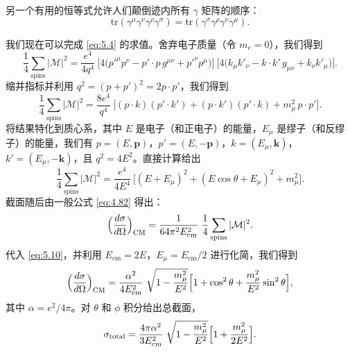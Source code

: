 另一个有用的恒等式允许人们颠倒迹内所有 $\gamma$ 矩阵的顺序：
\begin{equation}
  \mathrm{tr}(\gamma^\mu\gamma^\nu\gamma^\rho\gamma^\sigma)
    = \mathrm{tr}(\gamma^\sigma\gamma^\rho\gamma^\nu\gamma^\mu) .
  \label{eq:5.7}
\end{equation}

我们现在可以完成 \eqref{eq:5.4} 的求值。舍弃电子质量（令 $m_e = 0$），我们得到
\begin{equation}
  \frac{1}{4}\sum_{\text{spins}}|\mathcal{M}|^2
    = \frac{e^4}{4q^4}\ \bigl[ 4\bigl( p'^{\mu}p^{\nu} - p'\cdot p\,g^{\mu\nu}
      + p'^{\nu}p^{\mu} \bigr) \bigr]\ \bigl[ 4\bigl( k_\mu k'_\nu
        - k\cdot k'\,g_{\mu\nu} + k_\nu k'_\mu \bigr) \bigr].
  \label{eq:5.8}
\end{equation}
缩并指标并利用 $q^2 = (p+p')^2 = 2p\cdot p'$，我们得到
\begin{equation}
  \frac{1}{4}\sum_{\text{spins}}|\mathcal{M}|^2
    = \frac{8e^4}{q^4}\ \bigl[ (p\cdot k)(p'\cdot k') + (p\cdot k')(p'\cdot k)
      + m_\mu^2\,p\cdot p' \bigr] .
  \label{eq:5.9}
\end{equation}
将结果特化到质心系，其中 $E$ 是电子（和正电子）的能量，$E_\mu$ 是缪子（和反缪子）的能量，我们有 $p = (E, \mathbf{p})$，$p' = (E, -\mathbf{p})$，$k = (E_\mu, \mathbf{k})$，$k' = (E_\mu, -\mathbf{k})$，且 $q^2 = 4E^2$。直接计算给出
\begin{equation}
  \frac{1}{4}\sum_{\text{spins}}|\mathcal{M}|^2
    = \frac{e^4}{4E^4}\ \bigl[ (E + E_\mu)^2 + (E\cos\theta + E_\mu)^2
      + m_\mu^2 \bigr] .
  \label{eq:5.10}
\end{equation}
截面随后由一般公式 \eqref{eq:4.82} 得出：
\begin{equation}
  \Bigl( \frac{d\sigma}{d\Omega} \Bigr)_{\mathrm{CM}}
    = \frac{1}{64\pi^2 E_{\mathrm{cm}}^2}\ \frac{1}{4}
      \sum_{\text{spins}}|\mathcal{M}|^2 .
  \label{eq:5.11}
\end{equation}
代入 \eqref{eq:5.10}，并利用 $E_{\mathrm{cm}} = 2E$，$E_\mu = E_{\mathrm{cm}}/2$ 进行化简，我们得到
\begin{equation}
  \Bigl( \frac{d\sigma}{d\Omega} \Bigr)_{\mathrm{CM}}
    = \frac{\alpha^2}{4E_{\mathrm{cm}}^2}\ \sqrt{1 - \frac{m_\mu^2}{E^2}}
      \Bigl[ 1 + \cos^2\theta + \frac{m_\mu^2}{E^2}\sin^2\theta \Bigr] ,
  \label{eq:5.12}
\end{equation}
其中 $\alpha = e^2/4\pi$。对 $\theta$ 和 $\phi$ 积分给出总截面，
\begin{equation}
  \sigma_{\mathrm{total}}
    = \frac{4\pi\alpha^2}{3E_{\mathrm{cm}}^2}\ \sqrt{1 - \frac{m_\mu^2}{E^2}}
      \Bigl[ 1 + \frac{m_\mu^2}{2E^2} \Bigr] .
  \label{eq:5.13}
\end{equation}
